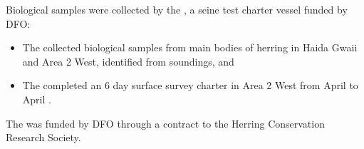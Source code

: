 Biological samples were collected by the ,
a seine test charter vessel funded by DFO:

\begin{itemize}

\item The  collected biological samples from main bodies of herring
 in Haida Gwaii and Area 2 West, identified from soundings, and

\item The  completed an 6 day surface survey charter
 in Area 2 West from April  to April .

\end{itemize}

The  was funded by DFO through a contract to
the Herring Conservation Research Society.
